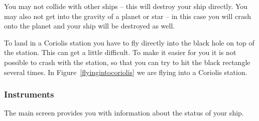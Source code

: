 \documentclass[a4paper,11pt]{article}
\begin{document}
You may not collide with other ships -- this will destroy your ship directly. You may also not get into the gravity of a planet or star -- in this case you will crash onto the planet and your ship will be destroyed as well.

To land in a Coriolis station you have to fly directly into the black hole on top of the station.%
This can get a little difficult. To make it easier for you it is not possible to crash with the station, so that you can try to hit the black rectangle several times.
In Figure~\ref{flyingintocoriolis} we are flying into a Coriolis station.

\subsubsection{Instruments}

The main screen provides you with information about the status of your ship. \\
\end{document}
